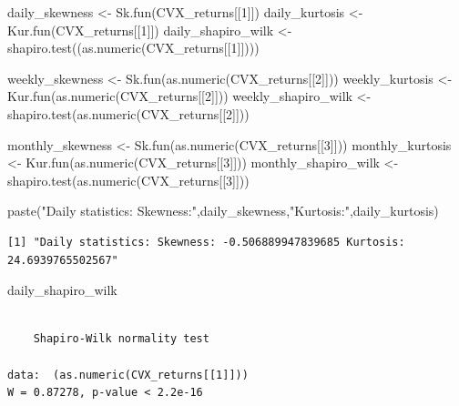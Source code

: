 \documentclass[
  letterpaper,
  DIV=11,
  numbers=noendperiod]{scrartcl}
\newenvironment{Shaded}{\begin{snugshade}}{\end{snugshade}}
\newcommand{\DecValTok}[1]{\textcolor[rgb]{0.68,0.00,0.00}{#1}}
\newcommand{\FunctionTok}[1]{\textcolor[rgb]{0.28,0.35,0.67}{#1}}
\newcommand{\NormalTok}[1]{\textcolor[rgb]{0.00,0.23,0.31}{#1}}
\newcommand{\OtherTok}[1]{\textcolor[rgb]{0.00,0.23,0.31}{#1}}
\newcommand{\StringTok}[1]{\textcolor[rgb]{0.13,0.47,0.30}{#1}}
\begin{document}
\begin{Shaded}
\begin{Highlighting}[]
\NormalTok{daily\_skewness }\OtherTok{\textless{}{-}} \FunctionTok{Sk.fun}\NormalTok{(CVX\_returns[[}\DecValTok{1}\NormalTok{]])}
\NormalTok{daily\_kurtosis }\OtherTok{\textless{}{-}} \FunctionTok{Kur.fun}\NormalTok{(CVX\_returns[[}\DecValTok{1}\NormalTok{]])}
\NormalTok{daily\_shapiro\_wilk }\OtherTok{\textless{}{-}} \FunctionTok{shapiro.test}\NormalTok{((}\FunctionTok{as.numeric}\NormalTok{(CVX\_returns[[}\DecValTok{1}\NormalTok{]])))}

\NormalTok{weekly\_skewness }\OtherTok{\textless{}{-}} \FunctionTok{Sk.fun}\NormalTok{(}\FunctionTok{as.numeric}\NormalTok{(CVX\_returns[[}\DecValTok{2}\NormalTok{]]))}
\NormalTok{weekly\_kurtosis }\OtherTok{\textless{}{-}} \FunctionTok{Kur.fun}\NormalTok{(}\FunctionTok{as.numeric}\NormalTok{(CVX\_returns[[}\DecValTok{2}\NormalTok{]]))}
\NormalTok{weekly\_shapiro\_wilk }\OtherTok{\textless{}{-}} \FunctionTok{shapiro.test}\NormalTok{(}\FunctionTok{as.numeric}\NormalTok{(CVX\_returns[[}\DecValTok{2}\NormalTok{]]))}

\NormalTok{monthly\_skewness }\OtherTok{\textless{}{-}} \FunctionTok{Sk.fun}\NormalTok{(}\FunctionTok{as.numeric}\NormalTok{(CVX\_returns[[}\DecValTok{3}\NormalTok{]]))}
\NormalTok{monthly\_kurtosis }\OtherTok{\textless{}{-}} \FunctionTok{Kur.fun}\NormalTok{(}\FunctionTok{as.numeric}\NormalTok{(CVX\_returns[[}\DecValTok{3}\NormalTok{]]))}
\NormalTok{monthly\_shapiro\_wilk }\OtherTok{\textless{}{-}} \FunctionTok{shapiro.test}\NormalTok{(}\FunctionTok{as.numeric}\NormalTok{(CVX\_returns[[}\DecValTok{3}\NormalTok{]]))}

\FunctionTok{paste}\NormalTok{(}\StringTok{"Daily statistics: Skewness:"}\NormalTok{,daily\_skewness,}\StringTok{"Kurtosis:"}\NormalTok{,daily\_kurtosis)}
\end{Highlighting}
\end{Shaded}

\begin{verbatim}
[1] "Daily statistics: Skewness: -0.506889947839685 Kurtosis: 24.6939765502567"
\end{verbatim}

\begin{Shaded}
\begin{Highlighting}[]
\NormalTok{daily\_shapiro\_wilk}
\end{Highlighting}
\end{Shaded}

\begin{verbatim}

    Shapiro-Wilk normality test

data:  (as.numeric(CVX_returns[[1]]))
W = 0.87278, p-value < 2.2e-16
\end{verbatim}
\end{document}
